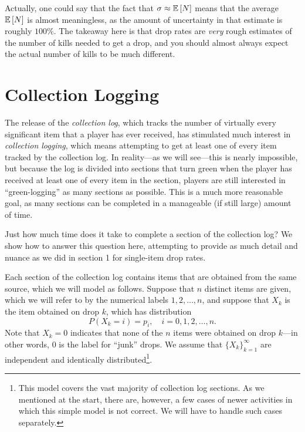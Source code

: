 \documentclass[letterpaper]{article}
\begin{document}
	Actually, one could say that the fact that $\sigma \approx \mathbb{E}\left[N\right]$ means that the average $\mathbb{E}\left[N\right]$ is almost meaningless, as the amount of uncertainty in that estimate is roughly $100\%$. The takeaway here is that drop rates are \textit{very} rough estimates of the number of kills needed to get a drop, and you should almost always expect the actual number of kills to be much different.
	
	\section{Collection Logging}
	
	The release of the \textit{collection log}, which tracks the number of virtually every significant item that a player has ever received, has stimulated much interest in \textit{collection logging}, which means attempting to get at least one of every item tracked by the collection log. In reality---as we will see---this is nearly impossible, but because the log is divided into sections that turn green when the player has received at least one of every item in the section, players are still interested in ``green-logging'' as many sections as possible. This is a much more reasonable goal, as many sections can be completed in a manageable (if still large) amount of time.
	
	Just how much time does it take to complete a section of the collection log? We show how to answer this question here, attempting to provide as much detail and nuance as we did in section 1 for single-item drop rates. 
	
	Each section of the collection log contains items that are obtained from the same source, which we will model as follows. Suppose that $n$ distinct items are given, which we will refer to by the numerical labels $1,2,\dots, n$, and suppose that $X_k$ is the item obtained on drop $k$, which has distribution
	\begin{equation*}
		P(X_k{=}i) = p_i, \quad i =0,1,2,\dots, n.
	\end{equation*}
	Note that $X_k = 0$ indicates that none of the $n$ items were obtained on drop $k$---in other words, $0$ is the label for ``junk'' drops. We assume that $\{X_k\}_{k=1}^\infty$ are independent and identically distributed\footnote{This model covers the vast majority of collection log sections. As we mentioned at the start, there are, however, a few cases of newer activities in which this simple model is not correct. We will have to handle such cases separately.}.
	
\end{document}

